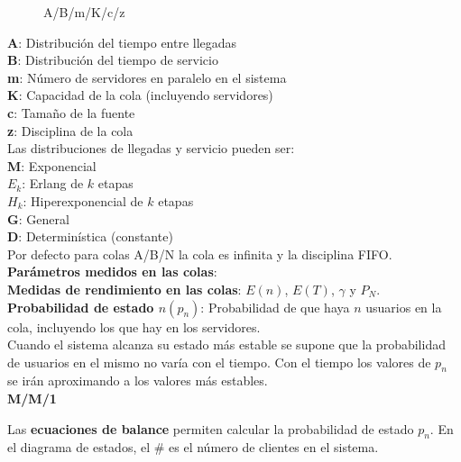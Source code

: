 \documentclass[9pt,landscape]{extarticle}
\begin{document}
\begin{multicols}{3}
\begin{wrapfigure}{L}{0.12\textwidth}
  \begin{center}
\large{A/B/m/K/c/z}
  \end{center}
\end{wrapfigure}
	
	\quad \textbf{A}: Distribución del tiempo entre llegadas\\
	\quad \textbf{B}: Distribución del tiempo de servicio\\
	\quad \textbf{m}: Número de servidores en paralelo en el sistema\\
	\quad \textbf{K}: Capacidad de la cola (incluyendo servidores)\\
	\quad \textbf{c}: Tamaño de la fuente\\
	\quad \textbf{z}: Disciplina de la cola\\

Las distribuciones de llegadas y servicio pueden ser:\\

	\quad \textbf{M}: Exponencial\\
	\quad \textbf{$E_{k}$}: Erlang de $k$ etapas\\
	\quad \textbf{$H_{k}$}: Hiperexponencial de $k$ etapas\\
	\quad \textbf{G}: General\\
	\quad \textbf{D}: Determinística (constante)\\
	
Por defecto para colas A/B/N la cola es infinita y la disciplina FIFO.\\

\textbf{Parámetros medidos en las colas}:\\
	\quad \textbf{Medidas de rendimiento en las colas}: $E(n)$, $E(T)$, $\gamma$ y $P_{N}$.\\
	\quad \textbf{Probabilidad de estado $n(p_{n})$}: Probabilidad de que haya $n$ usuarios en la cola, incluyendo los que hay en los servidores.\\

Cuando el sistema alcanza su estado más estable se supone que la probabilidad de usuarios en el mismo no varía con el tiempo. Con el tiempo los valores de $p_{n}$ se irán aproximando a los valores más estables.\\


	\quad \textbf{M/M/1}

Las \textbf{ecuaciones de balance} permiten calcular la probabilidad de estado $p_{n}$. En el diagrama de estados, el $\#$ es el número de clientes en el sistema.


\end{multicols}
\end{document}
